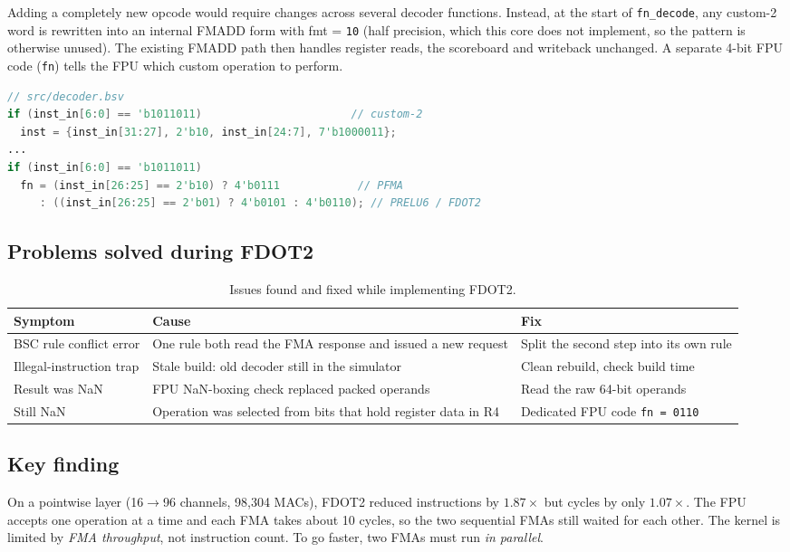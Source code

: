 Adding a completely new opcode would require changes across several decoder
functions. Instead, at the start of \texttt{fn\_decode}, any custom-2 word is
rewritten into an internal FMADD form with fmt = \texttt{10} (half
precision, which this core does not implement, so the pattern is otherwise
unused). The existing FMADD path then handles register reads, the
scoreboard and writeback unchanged. A separate 4-bit FPU code
(\texttt{fn}) tells the FPU which custom operation to perform.

\begin{lstlisting}[language=Verilog,basicstyle=\ttfamily\small]
// src/decoder.bsv
if (inst_in[6:0] == 'b1011011)                       // custom-2
  inst = {inst_in[31:27], 2'b10, inst_in[24:7], 7'b1000011};
...
if (inst_in[6:0] == 'b1011011)
  fn = (inst_in[26:25] == 2'b10) ? 4'b0111            // PFMA
     : ((inst_in[26:25] == 2'b01) ? 4'b0101 : 4'b0110); // PRELU6 / FDOT2
\end{lstlisting}

\subsection{Problems solved during FDOT2}

\begin{table}[h]
\centering\small
\begin{tabular}{p{4.3cm}p{4.3cm}p{5cm}}\toprule
Symptom & Cause & Fix\\\midrule
BSC rule conflict error & One rule both read the FMA response and issued a new request & Split the second step into its own rule\\
Illegal-instruction trap & Stale build: old decoder still in the simulator & Clean rebuild, check build time\\
Result was NaN & FPU NaN-boxing check replaced packed operands & Read the raw 64-bit operands\\
Still NaN & Operation was selected from bits that hold register data in R4 & Dedicated FPU code \texttt{fn = 0110}\\\bottomrule
\end{tabular}
\caption{Issues found and fixed while implementing FDOT2.}
\end{table}

\subsection{Key finding}

On a pointwise layer (16$\rightarrow$96 channels, 98,304 MACs), FDOT2 reduced
instructions by $1.87\times$ but cycles by only $1.07\times$. The FPU accepts
one operation at a time and each FMA takes about 10 cycles, so the two
sequential FMAs still waited for each other. The kernel is limited by
\emph{FMA throughput}, not instruction count. To go faster, two FMAs must run
\emph{in parallel}.

